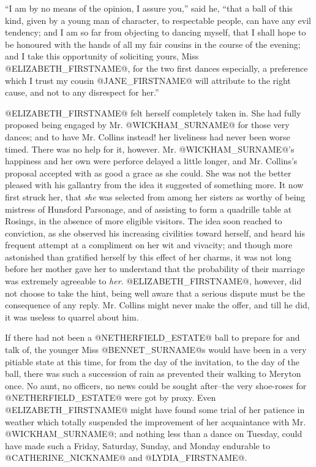 ``I am by no means of the opinion, I assure you,'' said he, ``that a ball
of this kind, given by a young man of character, to respectable people,
can have any evil tendency; and I am so far from objecting to dancing
myself, that I shall hope to be honoured with the hands of all my fair
cousins in the course of the evening; and I take this opportunity of
soliciting yours, Miss @ELIZABETH_FIRSTNAME@, for the two first dances especially,
a preference which I trust my cousin @JANE_FIRSTNAME@ will attribute to the right
cause, and not to any disrespect for her.''

@ELIZABETH_FIRSTNAME@ felt herself completely taken in. She had fully proposed being
engaged by Mr. @WICKHAM_SURNAME@ for those very dances; and to have Mr. Collins
instead! her liveliness had never been worse timed. There was no help
for it, however. Mr. @WICKHAM_SURNAME@'s happiness and her own were perforce
delayed a little longer, and Mr. Collins's proposal accepted with as
good a grace as she could. She was not the better pleased with his
gallantry from the idea it suggested of something more. It now first
struck her, that \textit{she} was selected from among her sisters as worthy
of being mistress of Hunsford Parsonage, and of assisting to form a
quadrille table at Rosings, in the absence of more eligible visitors.
The idea soon reached to conviction, as she observed his increasing
civilities toward herself, and heard his frequent attempt at a
compliment on her wit and vivacity; and though more astonished than
gratified herself by this effect of her charms, it was not long before
her mother gave her to understand that the probability of their marriage
was extremely agreeable to \textit{her}. @ELIZABETH_FIRSTNAME@, however, did not choose
to take the hint, being well aware that a serious dispute must be the
consequence of any reply. Mr. Collins might never make the offer, and
till he did, it was useless to quarrel about him.

If there had not been a @NETHERFIELD_ESTATE@ ball to prepare for and talk of, the
younger Miss @BENNET_SURNAME@s would have been in a very pitiable state at this
time, for from the day of the invitation, to the day of the ball, there
was such a succession of rain as prevented their walking to Meryton
once. No aunt, no officers, no news could be sought after--the very
shoe-roses for @NETHERFIELD_ESTATE@ were got by proxy. Even @ELIZABETH_FIRSTNAME@ might have
found some trial of her patience in weather which totally suspended the
improvement of her acquaintance with Mr. @WICKHAM_SURNAME@; and nothing less than
a dance on Tuesday, could have made such a Friday, Saturday, Sunday, and
Monday endurable to @CATHERINE_NICKNAME@ and @LYDIA_FIRSTNAME@.



